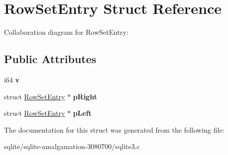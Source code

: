 \hypertarget{struct_row_set_entry}{\section{Row\+Set\+Entry Struct Reference}
\label{struct_row_set_entry}
}


Collaboration diagram for Row\+Set\+Entry\+:
\subsection*{Public Attributes}
\begin{DoxyCompactItemize}
\item 
\hypertarget{struct_row_set_entry_ac72670935246f1bff5e4d96703574071}{i64 {\bfseries v}}\label{struct_row_set_entry_ac72670935246f1bff5e4d96703574071}

\item 
\hypertarget{struct_row_set_entry_ac39c09525dd24f42af522587d1bc5026}{struct \hyperlink{struct_row_set_entry}{Row\+Set\+Entry} $\ast$ {\bfseries p\+Right}}\label{struct_row_set_entry_ac39c09525dd24f42af522587d1bc5026}

\item 
\hypertarget{struct_row_set_entry_a59365203c30ce782ae38e534c90db14b}{struct \hyperlink{struct_row_set_entry}{Row\+Set\+Entry} $\ast$ {\bfseries p\+Left}}\label{struct_row_set_entry_a59365203c30ce782ae38e534c90db14b}

\end{DoxyCompactItemize}


The documentation for this struct was generated from the following file\+:\begin{DoxyCompactItemize}
\item 
sqlite/sqlite-\/amalgamation-\/3080700/sqlite3.\+c\end{DoxyCompactItemize}
